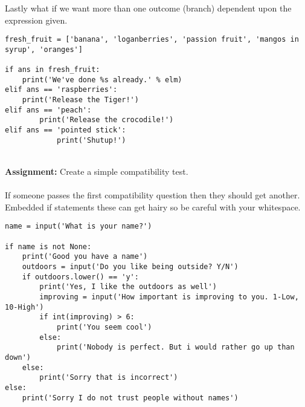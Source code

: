 \documentclass[../main.tex]{subfiles}
\begin{document}
Lastly what if we want more than one outcome (branch) dependent upon the expression given. \\
\begin{lstlisting}
fresh_fruit = ['banana', 'loganberries', 'passion fruit', 'mangos in syrup', 'oranges']

if ans in fresh_fruit:
    print('We've done %s already.' % elm)
elif ans == 'raspberries':
    print('Release the Tiger!')
elif ans == 'peach':
        print('Release the crocodile!')
elif ans == 'pointed stick':
            print('Shutup!')
\end{lstlisting}
\\
\textbf{Assignment:}
Create a simple compatibility test.\\
\\
If someone passes the first compatibility question then they should get another. Embedded if statements these can get hairy so be careful with your whitespace.\\
\begin{lstlisting}[caption=Example]
name = input('What is your name?')

if name is not None:
    print('Good you have a name')
    outdoors = input('Do you like being outside? Y/N')
    if outdoors.lower() == 'y':
        print('Yes, I like the outdoors as well')
        improving = input('How important is improving to you. 1-Low, 10-High')
        if int(improving) > 6:
            print('You seem cool')
        else:
            print('Nobody is perfect. But i would rather go up than down')
    else:
        print('Sorry that is incorrect')
else:
    print('Sorry I do not trust people without names')
\end{lstlisting}
\newpage
\end{document}
